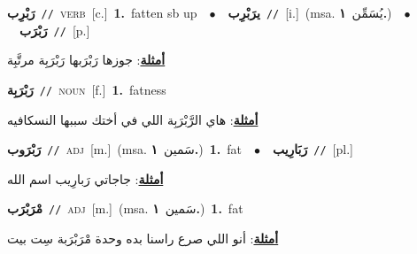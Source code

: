 \documentclass[10pt,a4paper,twoside]{article} %
\begin{document}
\begin{multicols}{2}
{{{{{{{{\setlength\topsep{0pt}\textbf{\foreignlanguage{arabic}{رَبْرِب}}\ {\color{gray}\texttt{//}\color{black}}\ \textsc{verb}\ [c.]\ \textbf{1.}~fatten sb up\ \ $\bullet$\ \ \setlength\topsep{0pt}\textbf{\foreignlanguage{arabic}{يرَبْرِب}}\ {\color{gray}\texttt{//}\color{black}}\ [i.]\ \color{gray}(msa. \foreignlanguage{arabic}{يُسَمِّن}~\foreignlanguage{arabic}{\textbf{١.}})\color{black}\ \ $\bullet$\ \ \setlength\topsep{0pt}\textbf{\foreignlanguage{arabic}{رَبْرَب}}\ {\color{gray}\texttt{//}\color{black}}\ [p.]\  \begin{flushright}\color{gray}\foreignlanguage{arabic}{\textbf{\underline{\foreignlanguage{arabic}{أمثلة}}}: جوزها رَبْرَبها رَبْرَبِة مرتَّبِة}\end{flushright}\color{black}} \vspace{2mm}

{\setlength\topsep{0pt}\textbf{\foreignlanguage{arabic}{رَبْرَبِة}}\ {\color{gray}\texttt{//}\color{black}}\ \textsc{noun}\ [f.]\ \textbf{1.}~fatness\  \begin{flushright}\color{gray}\foreignlanguage{arabic}{\textbf{\underline{\foreignlanguage{arabic}{أمثلة}}}: هاي الرَّبْرَبِة اللي في أختك سببها النسكافيه}\end{flushright}\color{black}} \vspace{2mm}

{\setlength\topsep{0pt}\textbf{\foreignlanguage{arabic}{رَبْرَوب}}\ {\color{gray}\texttt{//}\color{black}}\ \textsc{adj}\ [m.]\ \color{gray}(msa. \foreignlanguage{arabic}{سَمين}~\foreignlanguage{arabic}{\textbf{١.}})\color{black}\ \textbf{1.}~fat\ \ $\bullet$\ \ \setlength\topsep{0pt}\textbf{\foreignlanguage{arabic}{رَبَارِيب}}\ {\color{gray}\texttt{//}\color{black}}\ [pl.]\  \begin{flushright}\color{gray}\foreignlanguage{arabic}{\textbf{\underline{\foreignlanguage{arabic}{أمثلة}}}: جاجاتي رَبارِيب اسم الله}\end{flushright}\color{black}} \vspace{2mm}

{\setlength\topsep{0pt}\textbf{\foreignlanguage{arabic}{مْرَبْرَب}}\ {\color{gray}\texttt{//}\color{black}}\ \textsc{adj}\ [m.]\ \color{gray}(msa. \foreignlanguage{arabic}{سَمين}~\foreignlanguage{arabic}{\textbf{١.}})\color{black}\ \textbf{1.}~fat\  \begin{flushright}\color{gray}\foreignlanguage{arabic}{\textbf{\underline{\foreignlanguage{arabic}{أمثلة}}}: أنو اللي صرع راسنا بده وحدة مْرَبْرَبة سِت بيت}\end{flushright}\color{black}} \vspace{2mm}

}}}}}}}
\end{multicols}
\end{document}
